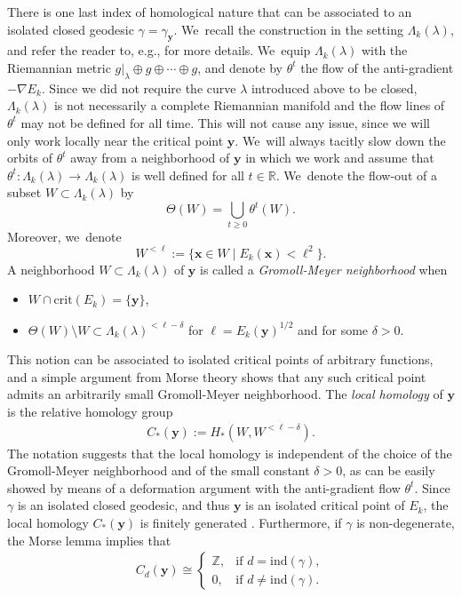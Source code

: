 \documentclass[JEP,XML,SOM,Unicode,NoFloatCountersInSection,published]{cedram}
\let\sep\mid
\let\bm\boldsymbol
\newcommand{\Z}{\mathbb{Z}}
\newcommand{\R}{\mathbb{R}}
\newcommand{\xx}{\bm{x}}
\newcommand{\yy}{\bm{y}}
\newcommand{\crit}{\mathrm{crit}}
\newcommand{\ind}{\mathrm{ind}}
\theoremstyle{plain}
\theoremstyle{definition}
\begin{document}
There is one last index of homological nature that can be associated to an isolated closed geodesic $\gamma=\gamma_{\yy}$. We~recall the construction in the setting $\Lambda_k(\lambda)$, and refer the reader to, e.g., \cite{Rademacher:1992aa,Bangert:2010aa,Asselle:2018aa} for more details. We~equip $\Lambda_k(\lambda)$ with the Riemannian metric $g|_\lambda\oplus g\oplus\cdots\oplus g$, and denote by $\theta^t$ the flow of the anti-gradient $-\nabla E_k$.
Since we did not require the curve $\lambda$ introduced above to be closed, $\Lambda_k(\lambda)$ is not necessarily a complete Riemannian manifold and the flow lines of $\theta^t$ may not be defined for all time. This will not cause any issue, since we will only work locally near the critical point $\yy$. We~will always tacitly slow down the orbits of $\theta^t$ away from a neighborhood of $\yy$ in which we work and assume that $\theta^t:\Lambda_k(\lambda)\to\Lambda_k(\lambda)$ is well defined for all $t\in\R$. We~denote the flow-out of a subset $W\subset\Lambda_k(\lambda)$ by
\[
\Theta(W)=\bigcup_{t\geq0} \theta^t(W).
\]
Moreover, we~denote \[
W^{<\ell}:=\big\{\xx\in W\sep E_k(\xx)<\ell^2\big\}.
\]
A neighborhood $W\subset \Lambda_k(\lambda)$ of $\yy$ is called a \emph{Gromoll-Meyer neighborhood} when
\begin{itemize}
\item $W\cap\crit(E_k)=\{\yy\}$,
\item $\Theta(W)\setminus W\subset \Lambda_k(\lambda)^{<\ell-\delta}$ for $\ell=E_k(\yy)^{1/2}$ and for some $\delta>0$.
\end{itemize}
This notion can be associated to isolated critical points of arbitrary functions, and a simple argument from Morse theory shows that any such critical point admits an arbitrarily small Gromoll-Meyer neighborhood.
The \emph{local homology} of $\yy$ is the relative homology group
\begin{align*}
C_*(\yy):=H_*(W,W^{<\ell-\delta}).
\end{align*}
The notation suggests that the local homology is independent of the choice of the Gromoll-Meyer neighborhood and of the small constant $\delta>0$, as can be easily showed by means of a deformation argument with the anti-gradient flow $\theta^t$.
Since $\gamma$ is an isolated closed geodesic, and thus $\yy$ is an isolated critical point of $E_k$, the local homology $C_*(\yy)$ is finitely generated \cite[p.\,364]{Gromoll:1969aa}. Furthermore, if $\gamma$ is non-degenerate, the Morse lemma \cite[Lem.\,2.2]{Milnor:1963aa} implies that
\begin{align}
\label{e:loc_hom_1}
C_d(\yy)
\cong
\begin{cases}
\Z, & \text{if } d=\ind(\gamma),\\
0, & \text{if } d\neq\ind(\gamma).
\end{cases}
\end{align}
\end{document}
